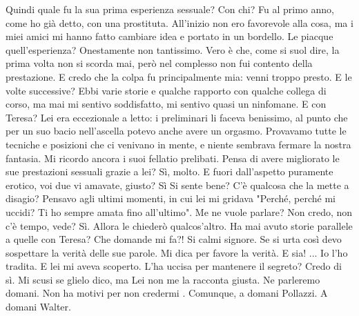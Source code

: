 \documentclass[a4paper,12pt]{article}
\newcommand{\Walter}{\speak{W}}
\newcommand{\Pollazzi}{\speak{P}}
\begin{document}
\begin{dialogue}
\Pollazzi  Quindi quale fu la sua prima esperienza sessuale? Con chi?
\Walter  Fu al primo anno, come ho già detto, con una prostituta. All'inizio non ero favorevole alla cosa, ma i miei amici mi hanno fatto cambiare idea e portato in un bordello.
\Pollazzi  Le piacque quell'esperienza?
\Walter  Onestamente non tantissimo. Vero è che, come si suol dire, la prima volta non si scorda mai, però nel complesso non fui contento della prestazione. E credo che la colpa fu principalmente mia: venni troppo presto.
\Pollazzi  E le volte successive?
\Walter  Ebbi varie storie e qualche rapporto con qualche collega di corso, ma mai mi sentivo soddisfatto, mi sentivo quasi un ninfomane.
\Pollazzi  E con Teresa?
\Walter  Lei era eccezionale a letto: i preliminari li faceva benissimo, al punto che per un suo bacio nell'ascella potevo anche avere un orgasmo. Provavamo tutte le tecniche e posizioni che ci venivano in mente, e niente sembrava fermare la nostra fantasia. Mi ricordo ancora i suoi fellatio prelibati.
\Pollazzi  Pensa di avere migliorato le sue prestazioni sessuali grazie a lei?
\Walter  Sì, molto.
\Pollazzi  E fuori dall'aspetto puramente erotico, voi due vi amavate, giusto?
\Walter  Sì 
\Pollazzi  Si sente bene? C'è qualcosa che la mette a disagio?
\Walter  Pensavo agli ultimi momenti, in cui lei mi gridava "Perché, perché mi uccidi? Ti ho sempre amata fino all'ultimo".
\Pollazzi  Me ne vuole parlare?
\Walter  Non credo, non c'è tempo, vede?
\Pollazzi  Sì. Allora le chiederò qualcos'altro. Ha mai avuto storie parallele a quelle con Teresa?
\Walter  Che domande mi fa?!
\Pollazzi  Si calmi signore. Se si urta così devo sospettare la verità delle sue parole. Mi dica per favore la verità.
\Walter  E sia! ...  Io l'ho tradita. E lei mi aveva scoperto.
\Pollazzi  L'ha uccisa per mantenere il segreto?
\Walter  Credo di sì.
\Pollazzi  Mi scusi se glielo dico, ma Lei non me la racconta giusta. Ne parleremo domani.
\Walter  Non ha motivi per non credermi . Comunque, a domani Pollazzi.
\Pollazzi  A domani Walter.
\end{dialogue}

\pagebreak
\end{document}
